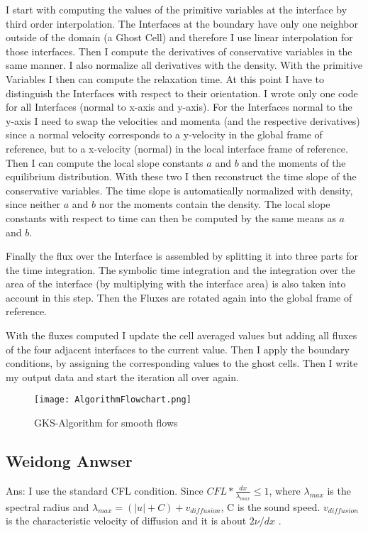 \documentclass[
	pdftex,             %
	12pt,				%
	a4paper,		   	%
	english,				%
	oneside,			%
]{article}
\begin{document}
I start with computing the values of the primitive variables at the interface by third order interpolation. The Interfaces at the boundary have only one neighbor outside of the domain (a Ghost Cell) and therefore I use linear interpolation for those interfaces. Then I compute the derivatives of conservative variables in the same manner. I also normalize all derivatives with the density. With the primitive Variables I then can compute the relaxation time. At this point I have to distinguish the Interfaces with respect to their orientation. I wrote only one code for all Interfaces (normal to x-axis and y-axis). For the Interfaces normal to the y-axis I need to swap the velocities and momenta (and the respective derivatives) since a normal velocity corresponds to a y-velocity in the global frame of reference, but to a x-velocity (normal) in the local interface frame of reference. Then I can compute the local slope constants $a$ and $b$ and the moments of the equilibrium distribution. With these two I then reconstruct the time slope of the conservative variables. The time slope is automatically normalized with density, since neither $a$ and $b$ nor the moments contain the density. The local slope constants with respect to time can then be computed by the same means as $a$ and $b$.

Finally the flux over the Interface is assembled by splitting it into three parts for the time integration. The symbolic time integration and the integration over the area of the interface (by multiplying with the interface area) is also taken into account in this step. Then the Fluxes are rotated again into the global frame of reference. 

With the fluxes computed I update the cell averaged values but adding all fluxes of the four adjacent interfaces to the current value. Then I apply the boundary conditions, by assigning the corresponding values to the ghost cells. Then I write my output data and start the iteration all over again.

\begin{figure}
\texttt{[image: AlgorithmFlowchart.png]}
\caption{GKS-Algorithm for smooth flows}
\label{fig:algorithm}
\end{figure}

\subsection{Weidong Anwser}

Ans: I use the standard CFL condition. Since $CFL*\frac{dx}{\lambda_{max}} \leq 1$, where $\lambda_{max}$ is the spectral radius and $\lambda_{max}=(|u|+C)+v_{diffusion}$, C is the sound speed. $v_{diffusion}$ is the characteristic velocity of diffusion and it is about $2\nu/dx$ .
\end{document}
